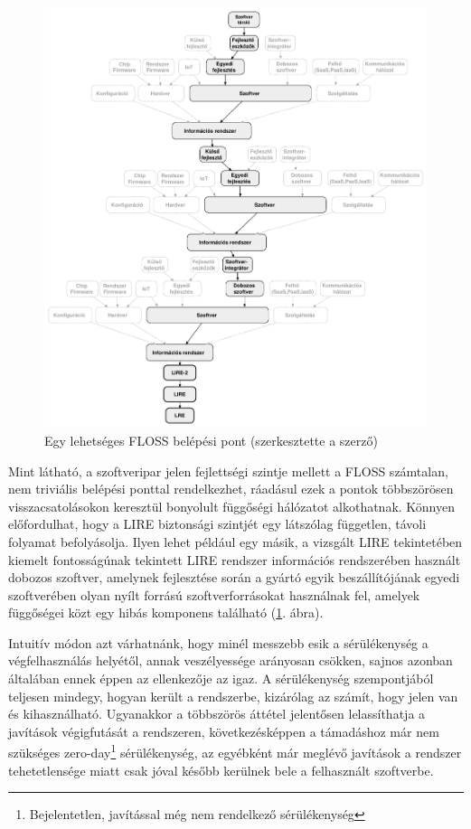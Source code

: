 \documentclass[12pt,magyar,a4paper,oneside]{scrreprt}
\begin{document}
\begin{figure}
\hypertarget{fig:FLOSSHatuxe1sExp}{%
\centering
\includegraphics{ábrák/FLOSS_hatáspontjai_example.pdf}
\caption{Egy lehetséges FLOSS belépési pont (szerkesztette a
szerző)}\label{fig:FLOSSHatuxe1sExp}
}
\end{figure}

Mint látható, a szoftveripar jelen fejlettségi szintje mellett a FLOSS
számtalan, nem triviális belépési ponttal rendelkezhet, ráadásul ezek a
pontok többszörösen visszacsatolásokon keresztül bonyolult függőségi
hálózatot alkothatnak. Könnyen előfordulhat, hogy a LIRE biztonsági
szintjét egy látszólag független, távoli folyamat befolyásolja. Ilyen
lehet például egy másik, a vizsgált LIRE tekintetében kiemelt
fontosságúnak tekintett LIRE rendszer információs rendszerében használt
dobozos szoftver, amelynek fejlesztése során a gyártó egyik
beszállítójának egyedi szoftverében olyan nyílt forrású
szoftverforrásokat használnak fel, amelyek függőségei közt egy hibás
komponens található (\ref{fig:FLOSSHatuxe1sExp}. ábra).

Intuitív módon azt várhatnánk, hogy minél messzebb esik a sérülékenység
a végfelhasználás helyétől, annak veszélyessége arányosan csökken,
sajnos azonban általában ennek éppen az ellenkezője az igaz. A
sérülékenység szempontjából teljesen mindegy, hogyan került a
rendszerbe, kizárólag az számít, hogy jelen van és kihasználható.
Ugyanakkor a többszörös áttétel jelentősen lelassíthatja a javítások
végigfutását a rendszeren, következésképpen a támadáshoz már nem
szükséges zero-day\footnote{Bejelentetlen, javítással még nem rendelkező
  sérülékenység} sérülékenység, az egyébként már meglévő javítások a
rendszer tehetetlensége miatt csak jóval később kerülnek bele a
felhasznált szoftverbe.
\end{document}
